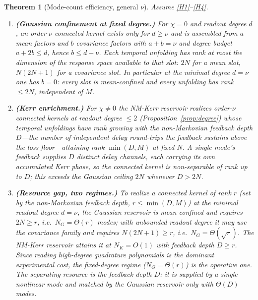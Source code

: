 \documentclass[11pt]{article}
\newtheorem{theorem}{Theorem}
\theoremstyle{remark}
\begin{document}
\begin{theorem}[Mode-count efficiency, general $\nu$]
\label{thm:scaling}
Assume \ref{H1}--\ref{H4}.
\begin{enumerate}[label=(\alph*)]
\item \textbf{(Gaussian confinement at fixed degree.)} For $\chi=0$ and readout
degree $d$, an order-$\nu$ connected kernel exists only for $d\ge\nu$ and is
assembled from $a$ mean factors and $b$ covariance factors with $a+b=\nu$ and
degree budget $a+2b\le d$, hence $b\le d-\nu$. Each temporal unfolding has rank at
most the dimension of the response space available to that slot: $2N$ for a
mean slot, $N(2N{+}1)$ for a covariance slot. In particular at the minimal degree
$d=\nu$ one has $b=0$: every slot is mean-confined and every unfolding has rank
$\le 2N$, independent of $M$.
\item \textbf{(Kerr enrichment.)} For $\chi\neq0$ the NM-Kerr reservoir realizes
order-$\nu$ connected kernels at readout degree $\le2$
(Proposition~\ref{prop:degree}) whose temporal unfoldings have rank growing with
the \emph{non-Markovian feedback depth} $D$---the number of independent delay
round-trips the feedback sustains above the loss floor---attaining rank
$\min(D,M)$ at fixed $N$. A single mode's feedback supplies $D$ distinct delay
channels, each carrying its own accumulated Kerr phase, so the connected kernel is
non-separable of rank up to $D$; this exceeds the Gaussian ceiling $2N$ whenever
$D>2N$.
\item \textbf{(Resource gap, two regimes.)} To realize a connected kernel of rank
$r$ (set by the non-Markovian feedback depth, $r\le\min(D,M)$) at the minimal
readout degree $d=\nu$, the Gaussian reservoir is mean-confined and requires
$2N\ge r$, i.e.\ $N_G=\Theta(r)$ modes; with unbounded readout degree it may use
the covariance family and requires $N(2N{+}1)\ge r$, i.e.\ $N_G=\Theta(\sqrt r)$.
The NM-Kerr reservoir attains it at $N_K=O(1)$ with feedback depth $D\ge r$. Since
reading high-degree quadrature polynomials is the dominant experimental cost, the
fixed-degree regime ($N_G=\Theta(r)$) is the operative one. The separating
resource is the feedback depth $D$: it is supplied by a single nonlinear mode and
matched by the Gaussian reservoir only with $\Theta(D)$ modes.
\end{enumerate}
\end{theorem}
\end{document}

